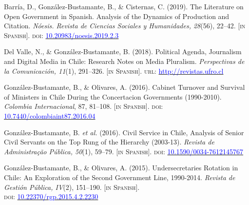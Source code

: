 \begin{publications}
\begin{benumerate}{8}
\item{\small Barr\'ia, D., Gonz\'alez-Bustamante, B., \& Cisternas, C. (2019). The Literature on Open Government in Spanish. Analysis of the Dynamics of Production and Citation. {\itshape N\'oesis. Revista de Ciencias Sociales y Humanidades, 28}(56), 22--42. {\footnotesize \scshape [in Spanish]}. {\scshape doi}: \href{http://dx.doi.org/10.20983/noesis.2019.2.3}{\textcolor{blue}{10.20983/noesis.2019.2.3}}}\vspace{1mm}

\item{\small Del Valle, N., \& Gonz\'alez-Bustamante, B. (2018). Political Agenda, Journalism and Digital Media in Chile: Research Notes on Media Pluralism. {\itshape Perspectivas de la Comunicaci\'on, 11}(1), 291--326. {\footnotesize \scshape [in Spanish]}. {\scshape url}: \href{http://revistas.ufro.cl/ojs/index.php/perspectivas/article/view/1146}{\textcolor{blue}{http://revistas.ufro.cl}}}\vspace{1mm}

\item{\small Gonz\'alez-Bustamante, B., \& Olivares, A. (2016). Cabinet Turnover and Survival of Ministers in Chile During the Concertacion Governments (1990-2010). {\itshape Colombia Internacional}, 87, 81--108. {\footnotesize \scshape [in Spanish]}. {\scshape doi}: \href{https://doi.org/10.7440/colombiaint87.2016.04}{\textcolor{blue}{10.7440/colombiaint87.2016.04}}}\vspace{1mm}

\item{\small Gonz\'alez-Bustamante, B. {\itshape et al.} (2016). Civil Service in Chile, Analysis of Senior Civil Servants on the Top Rung of the Hierarchy (2003-13). {\itshape Revista de Administra\c{c}\~ao P\'ublica, 50}(1), 59--79. {\footnotesize \scshape [in Spanish]}. {\scshape doi}: \href{http://dx.doi.org/10.1590/0034-7612145767}{\textcolor{blue}{10.1590/0034-7612145767}}} \vspace{1mm}

\item{\small Gonz\'alez-Bustamante, B., \& Olivares, A. (2015). Undersecretaries Rotation in Chile: An Exploration of the Second Government Line, 1990-2014. {\itshape Revista de Gesti\'on P\'ublica, IV}(2), 151--190. {\footnotesize \scshape [in Spanish]}. \\ {\scshape doi}: \href{https://doi.org/10.22370/rgp.2015.4.2.2230}{\textcolor{blue}{10.22370/rgp.2015.4.2.2230}}} \vspace{1mm}\pagebreak

\end{benumerate}

\end{publications}

